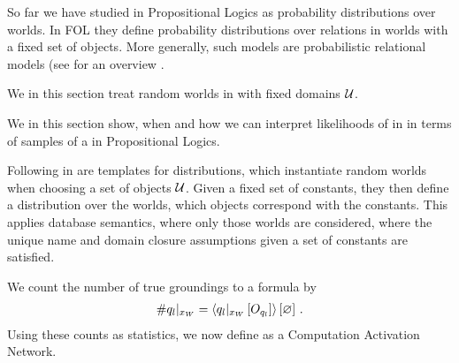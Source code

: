 



So far we have studied \MarkovLogicNetworks{} in Propositional Logics as probability distributions over worlds.
In FOL they define probability distributions over relations in worlds with a fixed set of objects.
More generally, such models are probabilistic relational models (see for an overview \cite{getoor_introduction_2019}.


We in this section treat random worlds in \firstOrderLogic{} with fixed domains $\mathcal{U}$.

%
We in this section show, when and how we can interpret likelihoods of \MarkovLogicNetworks{} in \firstOrderLogic{} in terms of samples of a \MarkovLogicNetwork{} in Propositional Logics.

\subsect{\HybridFOLNetworks{}}

Following \cite{richardson_markov_2006} \MarkovLogicNetworks{} in \firstOrderLogic{} are templates for distributions, which instantiate random worlds when choosing a set of objects $\mathcal{U}$.
Given a fixed set of constants, they then define a distribution over the worlds, which objects correspond with the constants. %
This applies database semantics, where only those worlds are considered, where the unique name and domain closure assumptions given a set of constants are satisfied.

We count the number of true groundings to a formula by
\begin{align*}
    \#q_{l}|_{x_{W}}
    = \left\langle {q_{l}}|_{x_{W}} \left[O_{q_{l}}\right]\right\rangle \left[ \varnothing \right] \, .
\end{align*}
Using these counts as statistics, we now define \HybridFOLNetworks{} as a Computation Activation Network.

